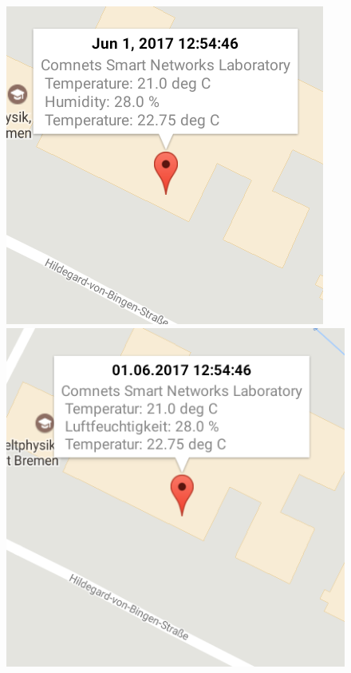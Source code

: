 \begin{figure}
\centering
\begin{minipage}{.3\textwidth}
  \centering
  \includegraphics[width=.8\linewidth]{src/marker_en.png}
\end{minipage}%
\begin{minipage}{.3\textwidth}
  \centering
  \includegraphics[width=.8\linewidth]{src/marker_de.png}
\end{minipage}
\begin{minipage}{.3\textwidth}
  \centering

\end{minipage}
\end{figure}
